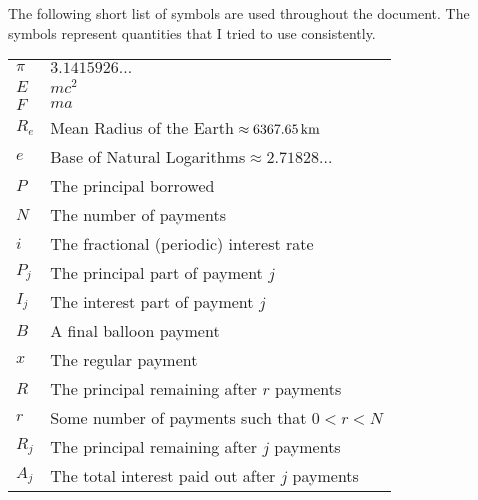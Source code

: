 \documentclass[11pt,copyright,expanded]{fsuthesis}
\begin{document}

\begin{listofsymbols}
The following short list of symbols are used throughout the document.
The symbols represent quantities that I tried to use consistently.
\begin{center}
\begin{tabular}{ll}
$\pi$&$3.1415926\ldots$\\
$E$&$mc^2$\\
$F$&$ma$\\
$R_e$&Mean Radius of the Earth${}\approx 6367.65\,\textup{km}$\\
$e$&Base of Natural Logarithms${}\approx 2.71828\ldots$\\
$P$&The principal borrowed\\
$N$&The number of payments\\
$i$&The fractional (periodic) interest rate\\
$P_j$&The principal part of payment $j$\\
$I_j$&The interest part of payment $j$\\
$B$&A final balloon payment\\
$x$&The regular payment\\
$R$&The principal remaining after $r$ payments \\
$r$&Some number of payments such that $0 < r < N$ \\
$R_j$&The principal remaining after $j$ payments \\
$A_j$&The total interest paid out after $j$ payments
\end{tabular}
\end{center}
\end{listofsymbols}

\end{document}
